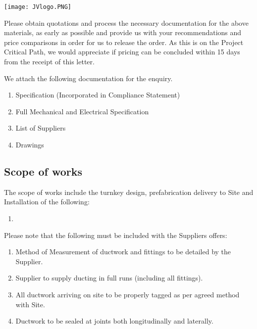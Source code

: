 \documentclass[a4paper,11pt,oneside]{article}
\begin{document}
\sffamily
\mbox{}
\texttt{[image: JVlogo.PNG]}
\vspace{1em}

\Date 


\TOMCD


\setlength{\parskip}{\baselineskip}


Please obtain quotations and process the necessary documentation for the above materials, as early as possible and provide us with your recommendations and price comparisons in order for us to release the order. As this is on the Project Critical Path, we would appreciate if pricing can be concluded within 15 days from the receipt of this letter.

We attach the following documentation for the enquiry. 

\begin{enumerate}

\item Specification (Incorporated in Compliance Statement)
\item Full Mechanical and Electrical Specification
\item List of Suppliers
\item Drawings
\end{enumerate}

\subsection*{Scope of works}

The scope of works include the turnkey design, prefabrication delivery to Site and Installation of the following:

\begin{enumerate}
\item  
\end{enumerate}

Please note that the following must be included with the Suppliers offers:

\begin{enumerate}
\item Method of Measurement of ductwork and fittings to be detailed by the Supplier. 
\item Supplier to supply ducting in full runs (including all fittings). 
\item All ductwork arriving on site to be properly tagged as per agreed method with Site.
\item Ductwork to be sealed at joints both longitudinally and laterally.

\end{enumerate}
\end{document}
